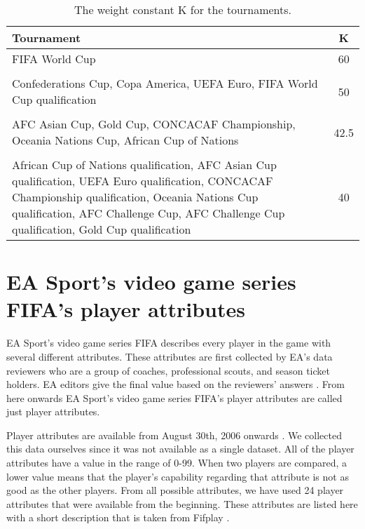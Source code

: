 \begin{table}
    \centering
    \caption{The weight constant $\mathrm { K }$ for the tournaments.}
    \label{table:weight_constant}
    \begin{tabular}{|L|c|}\hline
        \textbf{Tournament} & \textbf{K} \\\hline
        FIFA World Cup & 60 \\
        & \\
        Confederations Cup, Copa America, UEFA Euro, FIFA World Cup qualification & 50 \\
        & \\
        AFC Asian Cup, Gold Cup, CONCACAF Championship, Oceania Nations Cup, African Cup of Nations &42.5\\
        & \\
        African Cup of Nations qualification, AFC Asian Cup qualification, UEFA Euro qualification, CONCACAF Championship qualification, Oceania Nations Cup qualification, AFC Challenge Cup, AFC Challenge Cup qualification, Gold Cup qualification &  40 \\ \hline
    \end{tabular}
\end{table}

\section{EA Sport’s video game series FIFA's player attributes}
EA Sport's video game series FIFA describes every player in the game with several different attributes. These attributes are first collected by EA's data reviewers who are a group of coaches, professional scouts, and season ticket holders. EA editors give the final value based on the reviewers' answers \cite{playerattr}. From here onwards EA Sport's video game series FIFA's player attributes are called just player attributes.

Player attributes are available from August 30th, 2006 onwards \cite{sofifa}. We collected this data ourselves since it was not available as a single dataset.
All of the player attributes have a value in the range of 0-99. When two players are compared, a lower value means that the player's capability regarding that attribute is not as good as the other players. From all possible attributes, we have used 24 player attributes that were available from the beginning. These attributes are listed here with a short description that is taken from Fifplay \cite{playerattr}.

